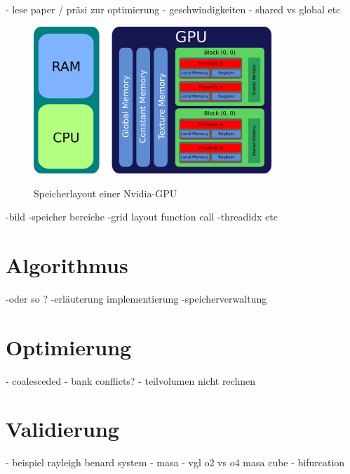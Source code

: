 - lese paper / präsi zur optimierung
- geschwindigkeiten
- shared vs global etc

\begin{figure}[!bp]
  \centering
  \includegraphics[width=0.8\textwidth]{gfx/cuda/gpu.png}\label{fig:gpu_arch}
  \caption{Speicherlayout einer Nvidia-GPU}
\end{figure}

-bild
-speicher bereiche
-grid layout function call
-threadidx etc

\section{Algorithmus}
-oder so ?
-erläuterung  implementierung
-speicherverwaltung

\section{Optimierung}
- coalesceded
- bank conflicts?
- teilvolumen nicht rechnen

\section{Validierung}
- beispiel rayleigh benard system
- masa
- vgl o2 vs o4 masa cube
- bifurcation


\newpage

